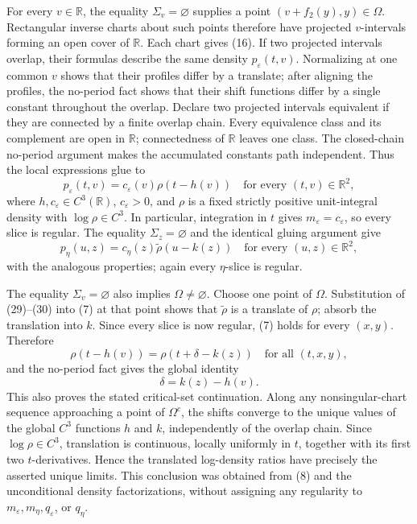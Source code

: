 For every \(v\in\mathbb R\), the equality \(\Sigma_v=\varnothing\) supplies a point \((v+f_2(y),y)\in\Omega\).  Rectangular inverse charts about such points therefore have projected \(v\)-intervals forming an open cover of \(\mathbb R\).  Each chart gives (16).  If two projected intervals overlap, their formulas describe the same density \(p_\varepsilon(t,v)\).  Normalizing at one common \(v\) shows that their profiles differ by a translate; after aligning the profiles, the no-period fact shows that their shift functions differ by a single constant throughout the overlap.  Declare two projected intervals equivalent if they are connected by a finite overlap chain.  Every equivalence class and its complement are open in \(\mathbb R\); connectedness of \(\mathbb R\) leaves one class.  The closed-chain no-period argument makes the accumulated constants path independent.  Thus the local expressions glue to
\[
 p_\varepsilon(t,v)=c_\varepsilon(v)\rho(t-h(v))
 \quad\text{for every }(t,v)\in\mathbb R^2,
\tag{29}
\]
where \(h,c_\varepsilon\in C^3(\mathbb R)\), \(c_\varepsilon>0\), and \(\rho\) is a fixed strictly positive unit-integral density with \(\log\rho\in C^3\).  In particular, integration in \(t\) gives \(m_\varepsilon=c_\varepsilon\), so every slice is regular.  The equality \(\Sigma_z=\varnothing\) and the identical gluing argument give
\[
 p_\eta(u,z)=c_\eta(z)\widetilde\rho(u-k(z))
 \quad\text{for every }(u,z)\in\mathbb R^2,
\tag{30}
\]
with the analogous properties; again every \(\eta\)-slice is regular.

The equality \(\Sigma_v=\varnothing\) also implies \(\Omega\ne\varnothing\).  Choose one point of \(\Omega\).  Substitution of (29)--(30) into (7) at that point shows that \(\widetilde\rho\) is a translate of \(\rho\); absorb the translation into \(k\).  Since every slice is now regular, (7) holds for every \((x,y)\).  Therefore
\[
 \rho(t-h(v))=\rho(t+\delta-k(z))
 \quad\text{for all }(t,x,y),
\]
and the no-period fact gives the global identity
\[
 \delta=k(z)-h(v).
\tag{31}
\]
This also proves the stated critical-set continuation.  Along any nonsingular-chart sequence approaching a point of \(\Omega^c\), the shifts converge to the unique values of the global \(C^3\) functions \(h\) and \(k\), independently of the overlap chain.  Since \(\log\rho\in C^3\), translation is continuous, locally uniformly in \(t\), together with its first two \(t\)-derivatives.  Hence the translated log-density ratios have precisely the asserted unique limits.  This conclusion was obtained from (8) and the unconditional density factorizations, without assigning any regularity to \(m_\varepsilon,m_\eta,q_\varepsilon\), or \(q_\eta\).

